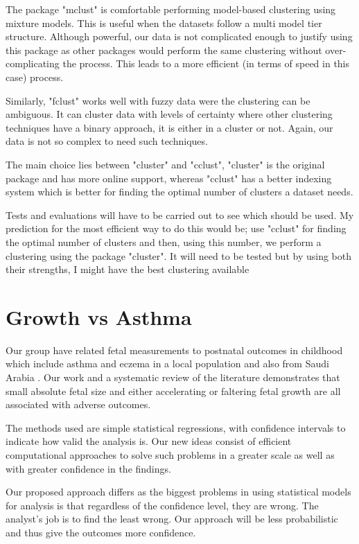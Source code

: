 \documentclass[bsc]{abdnthesis}
\begin{document}
The package "mclust" is comfortable performing model-based clustering using mixture models. This is useful when the datasets follow a multi model tier structure. Although powerful, our data is not complicated enough to justify using this package as other packages would perform the same clustering without over-complicating the process. This leads to a more efficient (in terms of speed in this case) process. 

Similarly, "fclust" works well with fuzzy data were the clustering can be ambiguous. It can cluster data with levels of certainty where other clustering techniques have a binary approach, it is either in a cluster or not. Again, our data is not so complex to need such techniques. 

The main choice lies between "cluster" and "cclust", "cluster" is the original package and has more online support, whereas "cclust" has a better indexing system which is better for finding the optimal number of clusters a dataset needs. 

Tests and evaluations will have to be carried out to see which should be used. My prediction for the most efficient way to do this would be; use "cclust" for finding the optimal number of clusters and then, using this number, we perform a clustering using the package "cluster". It will need to be tested but by using both their strengths, I might have the best clustering available
\section{Growth vs Asthma} %
\label{sec:growth_vs_asthma}
Our group  have related fetal measurements to postnatal outcomes in childhood which include asthma and eczema in a local population \cite{turner1, turner2, turner3} and also from Saudi Arabia \cite{ saudi}.  Our work and a systematic review of the literature demonstrates that small absolute fetal size and either accelerating or faltering fetal growth are all associated with adverse outcomes. 

The methods used are simple statistical regressions, with confidence intervals to indicate how valid the analysis is. Our new ideas consist of efficient computational approaches to solve such problems in a greater scale as well as with greater confidence in the findings.

Our proposed approach differs as the biggest problems in using statistical models for analysis is that regardless of the confidence level, they are wrong. The analyst's job is to find the least wrong. Our approach will be less probabilistic and thus give the outcomes more confidence. 
\end{document}
